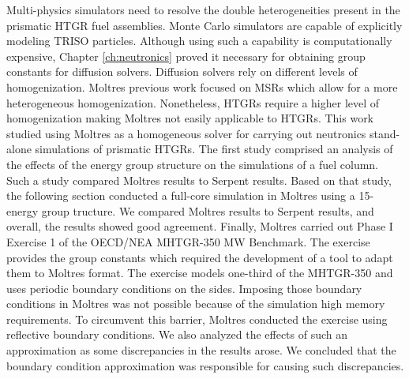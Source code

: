 Multi-physics simulators need to resolve the double heterogeneities present in the prismatic HTGR fuel assemblies.
Monte Carlo simulators are capable of explicitly modeling TRISO particles.
Although using such a capability is computationally expensive, Chapter \ref{ch:neutronics} proved it necessary for obtaining group constants for diffusion solvers.
Diffusion solvers rely on different levels of homogenization.
Moltres previous work focused on MSRs which allow for a more heterogeneous homogenization.
Nonetheless, HTGRs require a higher level of homogenization making Moltres not easily applicable to HTGRs.
This work studied using Moltres as a homogeneous solver for carrying out neutronics stand-alone simulations of prismatic HTGRs.
The first study comprised an analysis of the effects of the energy group structure on the simulations of a fuel column.
Such a study compared Moltres results to Serpent results.
Based on that study, the following section conducted a full-core simulation in Moltres using a 15-energy group tructure.
We compared Moltres results to Serpent results, and overall, the results showed good agreement.
Finally, Moltres carried out Phase I Exercise 1 of the OECD/NEA MHTGR-350 MW Benchmark.
The exercise provides the group constants which required the development of a tool to adapt them to Moltres format.
The exercise models one-third of the MHTGR-350 and uses periodic boundary conditions on the sides.
Imposing those boundary conditions in Moltres was not possible because of the simulation high memory requirements.
To circumvent this barrier, Moltres conducted the exercise using reflective boundary conditions.
We also analyzed the effects of such an approximation as some discrepancies in the results arose.
We concluded that the boundary condition approximation was responsible for causing such discrepancies.

